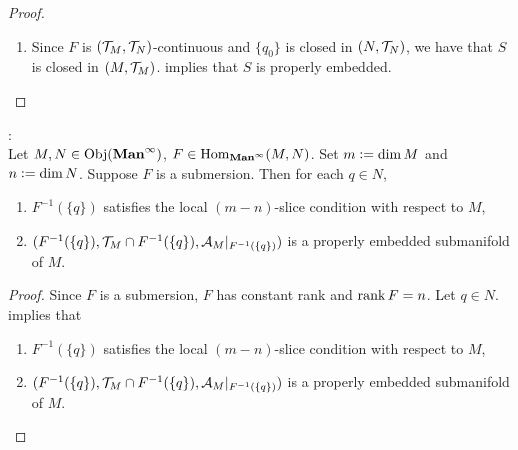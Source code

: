 \documentclass{book}
\begin{document}
\begin{proof}
\begin{enumerate}
\begin{itemize}
\begin{align*}
					& \neq \psi \circ F \circ \phi_0^{-1}(\phi_0(p')) \\
					& = (0, \prj_{-r}(\phi(p'))).
				\end{align*}
				Therefore $\prj_{-r}(\phi(p')) \neq 0$. Hence $\phi(p') \in (\S^{m, m-r})^c$. Since $p' \in (U \cap S)^c$ is arbitrary, we have that 
				\begin{align*}
					\phi(U \cap S)^c
					& = \phi((U \cap S)^c) \\
					& \subset (\S^{m, m-r})^c \\
					& \subset (\phi(U) \cap \S^{m, m-r})^c
				\end{align*}
				Thus $\phi(U) \cap \S^{m, m-r} \subset \phi(U \cap S)$. 
			\end{itemize}
			Therefore $\phi(U \cap S) = \phi(U) \cap \S^{m, m-r}$ and $\phi(U \cap S)$ is a $(m-r)$-slice of $\phi(U)$. Hence $(U, \phi)$ is an $(m-r)$-slice chart on $S$. Since $p \in S$ is arbitrary, we have that for each $p \in S$, there exists $(U, \phi) \in \MA_M$ such that $p \in U$ and $(U, \phi)$ is an $(m-r)$-slice chart on $S$. So $S$ satisfies the local $(m-r)$-slice condition with respect to $M$.  
			\item Since $F$ is $(\mathcal{T}_M, \mathcal{T}_N)$-continuous and $\{q_0\}$ is closed in $(N, \mathcal{T}_N)$, we have that $S$ is closed in $(M, \mathcal{T}_M)$. \rex{}  implies that $S$ is properly embedded.
		\end{enumerate}
	\end{proof}
	
	\begin{ex}  : \\
		Let $M, N \in \operatorname{Obj}(\operatorname*{\text{\textbf{Man}}^{\infty}})$, $F \in \operatorname{Hom}_{\operatorname*{\text{\textbf{Man}}^{\infty}}}(M,N)$. Set $m \vcentcolon= \dim M$ and $n \vcentcolon= \dim N$. Suppose $F$ is a submersion. Then for each $q \in N$, 
		\begin{enumerate}
			\item $F^{-1}(\{q\})$ satisfies the local $(m-n)$-slice condition with respect to $M$,
			\item $(F^{-1}(\{q\}), \mathcal{T}_M \cap F^{-1}(\{q\}), \mathcal{A}_M|_{F^{-1}(\{q\})})$ is a properly embedded submanifold of $M$.
		\end{enumerate}
	\end{ex}

	\begin{proof}
		Since $F$ is a submersion, $F$ has constant rank and $\operatorname{\text{rank}} F = n$. Let $q \in N$. \rex{}  implies that 
		\begin{enumerate}
			\item $F^{-1}(\{q\})$ satisfies the local $(m-n)$-slice condition with respect to $M$,
			\item $(F^{-1}(\{q\}), \mathcal{T}_M \cap F^{-1}(\{q\}), \mathcal{A}_M|_{F^{-1}(\{q\})})$ is a properly embedded submanifold of $M$.
		\end{enumerate}
	\end{proof}
	
\end{document}
